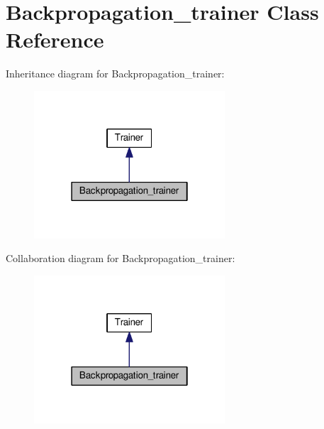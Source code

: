 \hypertarget{classBackpropagation__trainer}{\section{Backpropagation\-\_\-trainer Class Reference}
\label{classBackpropagation__trainer}
}


Inheritance diagram for Backpropagation\-\_\-trainer\-:
\nopagebreak
\begin{figure}[H]
\begin{center}
\leavevmode
\includegraphics[width=202pt]{classBackpropagation__trainer__inherit__graph}
\end{center}
\end{figure}


Collaboration diagram for Backpropagation\-\_\-trainer\-:
\nopagebreak
\begin{figure}[H]
\begin{center}
\leavevmode
\includegraphics[width=202pt]{classBackpropagation__trainer__coll__graph}
\end{center}
\end{figure}
